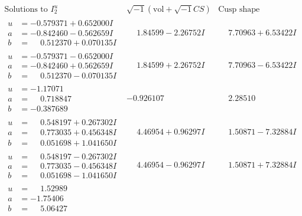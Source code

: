 \documentclass[1p]{elsarticle_modified}
\theoremstyle{definition}
\newcommand{\I}{\sqrt{-1}}
\begin{document}
$$\begin{array}{c|c|c}  
\text{Solutions to }I^u_{2}& \I (\text{vol} + \sqrt{-1}CS) & \text{Cusp shape}\\
 \hline 
\begin{aligned}
u &= -0.579371 + 0.652000 I \\
a &= -0.842460 - 0.562659 I \\
b &= \phantom{-}0.512370 + 0.070135 I\end{aligned}
 & \phantom{-}1.84599 - 2.26752 I & \phantom{-}7.70963 + 6.53422 I \\ \hline\begin{aligned}
u &= -0.579371 - 0.652000 I \\
a &= -0.842460 + 0.562659 I \\
b &= \phantom{-}0.512370 - 0.070135 I\end{aligned}
 & \phantom{-}1.84599 + 2.26752 I & \phantom{-}7.70963 - 6.53422 I \\ \hline\begin{aligned}
u &= -1.17071\phantom{ +0.000000I} \\
a &= \phantom{-}0.718847\phantom{ +0.000000I} \\
b &= -0.387689\phantom{ +0.000000I}\end{aligned}
 & -0.926107\phantom{ +0.000000I} & \phantom{-}2.28510\phantom{ +0.000000I} \\ \hline\begin{aligned}
u &= \phantom{-}0.548197 + 0.267302 I \\
a &= \phantom{-}0.773035 + 0.456348 I \\
b &= \phantom{-}0.051698 + 1.041650 I\end{aligned}
 & \phantom{-}4.46954 + 0.96297 I & \phantom{-}1.50871 - 7.32884 I \\ \hline\begin{aligned}
u &= \phantom{-}0.548197 - 0.267302 I \\
a &= \phantom{-}0.773035 - 0.456348 I \\
b &= \phantom{-}0.051698 - 1.041650 I\end{aligned}
 & \phantom{-}4.46954 - 0.96297 I & \phantom{-}1.50871 + 7.32884 I \\ \hline\begin{aligned}
u &= \phantom{-}1.52989\phantom{ +0.000000I} \\
a &= -1.75406\phantom{ +0.000000I} \\
b &= \phantom{-}5.06427\phantom{ +0.000000I}\end{aligned}

\end{array}$$
\end{document}
